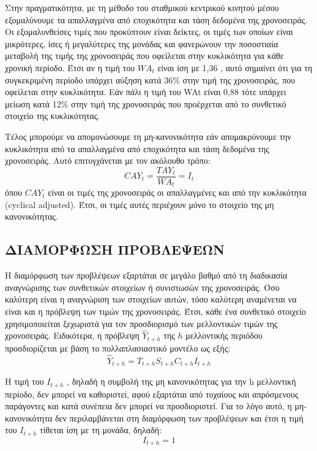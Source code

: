 Στην πραγματικότητα, με τη μέθοδο του σταθμικού κεντρικού κινητού μέσου
εξομαλύνουμε τα απαλλαγμένα από εποχικότητα και τάση δεδομένα της
χρονοσειράς. Οι εξομαλυνθείσες τιμές που προκύπτουν είναι δείκτες, οι τιμές των
οποίων είναι μικρότερες, ίσες ή μεγαλύτερες της μονάδας και φανερώνουν την
ποσοστιαία μεταβολή της τιμής της χρονοσειράς που οφείλεται στην κυκλικότητα για
κάθε χρονική περίοδο. Έτσι αν η τιμή του $WA_t$ είναι ίση με 1,36 , αυτό σημαίνει ότι
για τη συγκεκριμένη περίοδο υπάρχει αύξηση κατά 36\% στην τιμή της χρονοσειράς,
που οφείλεται στην κυκλικότητα. Εάν πάλι η τιμή του WAt είναι 0,88 τότε υπάρχει
μείωση κατά 12\% στην τιμή της χρονοσειράς που προέρχεται από το συνθετικό
στοιχείο της κυκλικότητας.

Τέλος μπορούμε να απομονώσουμε τη μη-κανονικότητα εάν απομακρύνουμε την
κυκλικότητα από τα απαλλαγμένα από εποχικότητα και τάση δεδομένα της
χρονοσειράς. Αυτό επιτυγχάνεται με τον ακόλουθο τρόπο:\\
$$ CAY_t=\frac{TAY_t}{WA_t}=I_t $$
όπου $CAY_t$ είναι οι τιμές της χρονοσειράς οι απαλλαγμένες και από την κυκλικότητα
(cyclical adjusted). Έτσι, οι τιμές αυτές περιέχουν μόνο το στοιχείο της μη
κανονικότητας.
\subsection{ΔΙΑΜΟΡΦΩΣΗ ΠΡΟΒΛΕΨΕΩΝ}
Η διαμόρφωση των προβλέψεων εξαρτάται σε μεγάλο βαθμό από τη διαδικασία
αναγνώρισης των συνθετικών στοιχείων ή συνιστωσών της χρονοσειράς. Όσο
καλύτερη είναι η αναγνώριση των στοιχείων αυτών, τόσο καλύτερη αναμένεται να
είναι και η πρόβλεψη των τιμών της χρονοσειράς. Έτσι, κάθε ένα συνθετικό στοιχείο
χρησιμοποιείται ξεχωριστά για τον προσδιορισμό των μελλοντικών τιμών της
χρονοσειράς. Ειδικότερα, η πρόβλεψη $\widehat{Y}_{t+h}$ της $h$ μελλοντικής περιόδου
προσδιορίζεται με βάση το πολλαπλασιαστικό μοντέλο ως εξής:\\
$$ \widehat{Y}_{t+h}=T_{t+h}S_{t+h}C_{t+h}I_{t+h} $$

Η τιμή του $I_{t+h}$ , δηλαδή η συμβολή της μη κανονικότητας για την h μελλοντική
περίοδο, δεν μπορεί να καθοριστεί, αφού εξαρτάται από τυχαίους και απρόσμενους
παράγοντες και κατά συνέπεια δεν μπορεί να προσδιοριστεί. Για το λόγο αυτό, η μη-
κανονικότητα δεν περιλαμβάνεται στη διαμόρφωση των προβλέψεων και έτσι η τιμή
του $I_{t+h}$ τίθεται ίση με τη μονάδα, δηλαδή:\\
$$ I_{t+h}=1 $$

